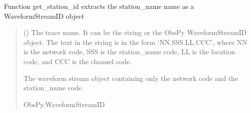 \documentclass[letterpaper,10pt,english]{sphinxmanual}
\begin{document}
\begin{fulllineitems}
\label{\detokenize{api_core:amw.core.utils.get_station_id}}
\pysigstartsignatures
{}
\pysigstopsignatures
\sphinxAtStartPar
Function get\_station\_id extracts the station\_name name as a WaveformStreamID object
\begin{quote}\begin{description}
\sphinxAtStartPar
{} () \textendash{} The trace name. It can be the string or the ObsPy WaveformStreamID object.
The text in the string is in the form ‘NN.SSS.LL.CCC’, where NN is the network code,
SSS is the station\_name code, LL is the location code, and CCC is the channel code.

\sphinxAtStartPar
The waveform stream object containing only the network code and the station\_name code.

\sphinxAtStartPar
ObsPy.WaveformStreamID

\end{description}\end{quote}

\end{fulllineitems}

\end{document}

